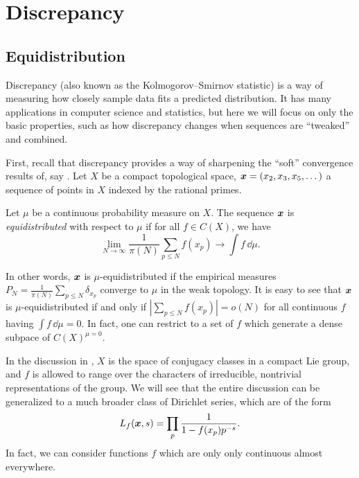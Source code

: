 
\chapter{Discrepancy}





\section{Equidistribution}

Discrepancy (also known as the Kolmogorov--Smirnov statistic) is a way of 
measuring how closely sample data fits a predicted distribution. It has many 
applications in computer science and statistics, but here we will focus on only 
the basic properties, such as how discrepancy changes when sequences 
are ``tweaked'' and combined. 

First, recall that discrepancy provides a way of sharpening the ``soft'' 
convergence results of, say \cite[A.1]{serre-1989}. Let $X$ be a compact 
topological space, ${\boldsymbol x} = (x_2,x_3,x_5,\dots)$ a sequence of points in $X$ 
indexed by the rational primes. 

\begin{definition}
Let $\mu$ be a continuous probability measure on $X$. The sequence ${\boldsymbol x}$ is 
\emph{equidistributed} with respect to $\mu$ if for all $f\in C(X)$, we have 
\[
	\lim_{N\to \infty} \frac{1}{\pi(N)} \sum_{p\leqslant N} f(x_p) \to \int f\, \dd \mu .
\]
\end{definition}

In other words, ${\boldsymbol x}$ is $\mu$-equidistributed if the empirical measures 
$P_N = \frac{1}{\pi(N)} \sum_{p\leqslant N} \delta_{x_p}$ converge to $\mu$ in 
the weak topology. It is easy to see that ${\boldsymbol x}$ is $\mu$-equidistributed if 
and only if $\left| \sum_{p\leqslant N} f(x_p)\right| = o(N)$ for all 
continuous $f$ having $\int f\, \dd\mu = 0$. In fact, one can restrict to a 
set of $f$ which generate a dense subpace of $C(X)^{\mu = 0}$. 

In the discussion in \cite[A.1]{serre-1989}, $X$ is the space of conjugacy 
classes in a compact Lie group, and $f$ is allowed to range over the characters 
of irreducible, nontrivial representations of the group. We will see that the 
entire discussion can be generalized to a much broader class of 
Dirichlet series, which are of the form 
\[
	L_f({\boldsymbol x},s) = \prod_p \frac{1}{1-f(x_p)p^{-s}} .
\]
In fact, we can consider functions $f$ which are only only continuous almost 
everywhere. 

